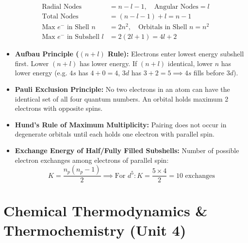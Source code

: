 \documentclass[10pt,twoside,openright]{book}
\begin{document}
\begin{formulabox}
\begin{align}
  \text{Radial Nodes} &= n - l - 1, \quad \text{Angular Nodes} = l \\
  \text{Total Nodes} &= (n - l - 1) + l = n - 1 \\
  \text{Max } e^- \text{ in Shell } n &= 2n^2, \quad \text{Orbitals in Shell } n = n^2 \\
  \text{Max } e^- \text{ in Subshell } l &= 2(2l + 1) = 4l + 2
\end{align}
\end{formulabox}

\begin{usecasebox}
\begin{itemize}
  \item \textbf{Aufbau Principle ($(n + l)$ Rule):} Electrons enter lowest energy subshell first. Lower $(n+l)$ has lower energy. If $(n+l)$ identical, lower $n$ has lower energy (e.g. $4s$ has $4+0=4$, $3d$ has $3+2=5 \implies 4s$ fills before $3d$).
  \item \textbf{Pauli Exclusion Principle:} No two electrons in an atom can have the identical set of all four quantum numbers. An orbital holds maximum 2 electrons with opposite spins.
  \item \textbf{Hund's Rule of Maximum Multiplicity:} Pairing does not occur in degenerate orbitals until each holds one electron with parallel spin.
  \item \textbf{Exchange Energy of Half/Fully Filled Subshells:} Number of possible electron exchanges among electrons of parallel spin:
  \begin{equation*}
    K = \frac{n_p(n_p - 1)}{2} \implies \text{For } d^5: K = \frac{5\times 4}{2} = 10 \text{ exchanges}
  \end{equation*}
\end{itemize}
\end{usecasebox}

\newpage

\section{Chemical Thermodynamics \& Thermochemistry (Unit 4)}
\end{document}
